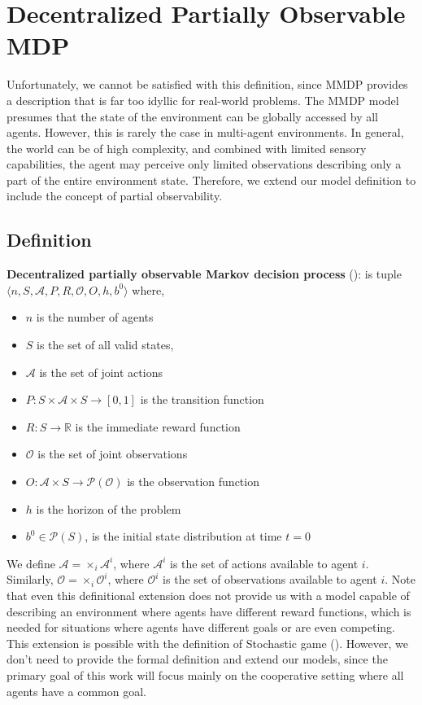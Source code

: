 \section{Decentralized Partially Observable MDP}
Unfortunately, we cannot be satisfied with this definition, since MMDP provides a description that is far too idyllic for real-world problems.
The MMDP model presumes that the state of the environment can be globally accessed by all agents.
However, this is rarely the case in multi-agent environments.
In general, the world can be of high complexity, and combined with limited sensory capabilities, the agent may perceive only limited observations describing only a part of the entire environment state.
Therefore, we extend our model definition to include the concept of partial observability.

\subsection*{Definition}
\textbf{Decentralized partially observable Markov decision process} (\cite{DecPOMDP}):
is tuple
$\langle n, S, \mathcal{A}, P, R, \mathcal{O}, O, h, b^0\rangle$ where,
\begin{itemize}
    \item $n$ is the number of agents
    \item $S$ is the set of all valid states,
    \item $\mathcal{A} $ is the set of joint actions
    \item $P: S \times \mathcal{A} \times S \rightarrow [0,1]$ is the transition function
    \item $R: S  \rightarrow \mathbb{R}$ is the immediate reward function
    \item $\mathcal{O}$ is the set of joint observations
    \item $O: \mathcal{A} \times S \rightarrow \mathcal{P}(\mathcal{O})$ is the observation function
    \item $h$ is the horizon of the problem
    \item $b^0 \in \mathcal{P}(S)$, is the initial state distribution at time $t=0$

\end{itemize}

We define $\mathcal{A} = \times_i \mathcal{A}^i$, where $\mathcal{A}^i$ is the set of actions available to agent $i$.
Similarly, $\mathcal{O} = \times_i \mathcal{O}^i$, where $\mathcal{O}^i$ is the set of observations available to agent $i$. 
Note that even this definitional extension does not provide us with a model capable of describing an environment where agents have different reward functions, which is needed for situations where agents have different goals or are even competing.
This extension is possible with the definition of Stochastic game (\cite{StochasticGame}). 
However, we don't need to provide the formal definition and extend our models, since the primary goal of this work will focus mainly on the cooperative setting where all agents have a common goal.

